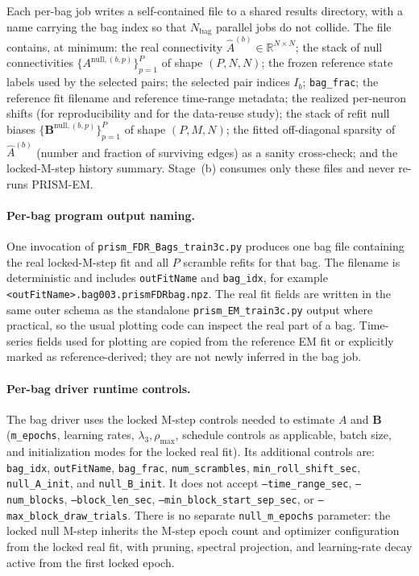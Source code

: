 \documentclass[11pt]{article}
\begin{document}
Each per-bag job writes a self-contained file to a shared results directory,
with a name carrying the bag index so that \(N_{\text{bag}}\) parallel jobs
do not collide. The file contains, at minimum: the real connectivity
\(\hat A^{(b)}\in\mathbb{R}^{N\times N}\); the stack of null connectivities
\(\{A^{\text{null},(b,p)}\}_{p=1}^{P}\) of shape \((P,N,N)\); the frozen
reference state labels used by the selected pairs; the selected pair indices
\(I_b\); \texttt{bag\_frac}; the reference fit filename and reference
time-range metadata; the realized per-neuron shifts (for reproducibility
and for the data-reuse study); the stack of refit null biases
\(\{\mathbf B^{\text{null},(b,p)}\}_{p=1}^{P}\) of shape \((P,M,N)\); the
fitted off-diagonal sparsity of \(\hat A^{(b)}\) (number and fraction of
surviving edges) as a sanity cross-check; and the locked-M-step history
summary. Stage~(b) consumes only these files and never re-runs PRISM-EM.

\paragraph{Per-bag program output naming.} One invocation of
\texttt{prism\_FDR\_Bags\_train3c.py} produces one bag file containing
the real locked-M-step fit and all \(P\) scramble refits for that bag. The
filename is deterministic and includes \texttt{outFitName} and
\texttt{bag\_idx}, for example
\texttt{<outFitName>.bag003.prismFDRbag.npz}. The real fit fields are written
in the same outer schema as the standalone \texttt{prism\_EM\_train3c.py}
output where practical, so the usual plotting code can inspect the real
part of a bag. Time-series fields used for plotting are copied from the
reference EM fit or explicitly marked as reference-derived; they are not
newly inferred in the bag job.

\paragraph{Per-bag driver runtime controls.} The bag driver uses the locked
M-step controls needed to estimate \(A\) and \(\mathbf B\)
(\texttt{m\_epochs}, learning rates, \(\lambda_3,\rho_{\max}\), schedule
controls as applicable, batch size, and initialization modes for the locked
real fit). Its additional controls are: \texttt{bag\_idx},
\texttt{outFitName}, \texttt{bag\_frac}, \texttt{num\_scrambles},
\texttt{min\_roll\_shift\_sec}, \texttt{null\_A\_init}, and
\texttt{null\_B\_init}. It does not accept
\texttt{--time\_range\_sec}, \texttt{--num\_blocks},
\texttt{--block\_len\_sec}, \texttt{--min\_block\_start\_sep\_sec}, or
\texttt{--max\_block\_draw\_trials}. There is no separate
\texttt{null\_m\_epochs} parameter: the locked null M-step inherits the
M-step epoch count and optimizer configuration from the locked real fit,
with pruning, spectral projection, and learning-rate decay active from the
first locked epoch.
\end{document}
